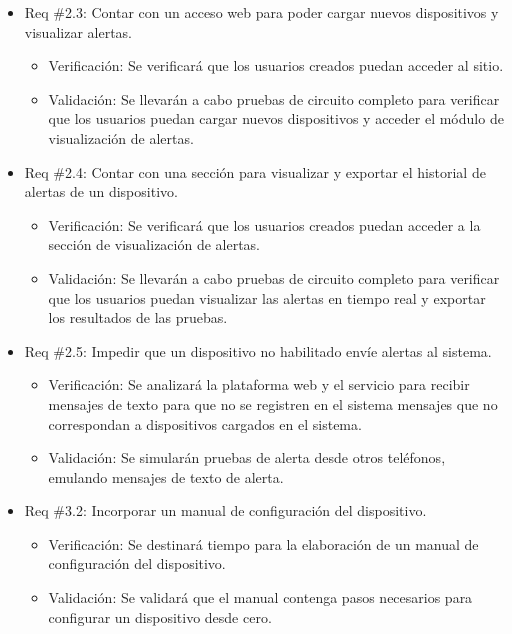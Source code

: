 \documentclass[
11pt, %
]{charter}
\begin{document}
\begin{itemize}
\item Req \#2.3: Contar con un acceso web para poder cargar nuevos dispositivos y visualizar alertas.

\begin{itemize}
	\item Verificación: Se verificará que los usuarios creados puedan acceder al sitio.
	\item Validación: Se llevarán a cabo pruebas de circuito completo para verificar que los usuarios puedan cargar nuevos dispositivos y acceder el módulo de visualización de alertas.
\end{itemize}

\item Req \#2.4: Contar con una sección para visualizar y exportar el historial de alertas de un dispositivo.

\begin{itemize}
	\item Verificación: Se verificará que los usuarios creados puedan acceder a la sección de visualización de alertas.
	\item Validación: Se llevarán a cabo pruebas de circuito completo para verificar que los usuarios puedan visualizar las alertas en tiempo real y exportar los resultados de las pruebas.
\end{itemize}

\item Req \#2.5: Impedir que un dispositivo no habilitado envíe alertas al sistema.

\begin{itemize}
	\item Verificación: Se analizará la plataforma web y el servicio para recibir mensajes de texto para que no se registren en el sistema mensajes que no correspondan a dispositivos cargados en el sistema. 
	\item Validación: Se simularán pruebas de alerta desde otros teléfonos, emulando mensajes de texto de alerta.
\end{itemize}

\item Req \#3.2: Incorporar un manual de configuración del dispositivo.

\begin{itemize}
	\item Verificación: Se destinará tiempo para la elaboración de un manual de configuración del dispositivo. 
	\item Validación: Se validará que el manual contenga pasos necesarios para configurar un dispositivo desde cero.
\end{itemize}

\end{itemize}
\end{document}
